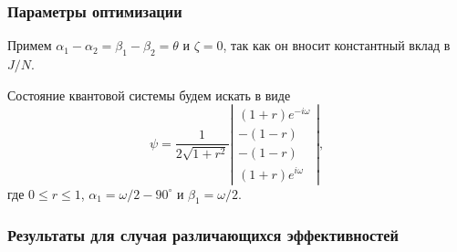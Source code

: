 \documentclass[11pt,pdf,hyperref={unicode}]{beamer}
\theoremstyle{definition}
\begin{document}
\begin{frame}
\frametitle{Параметры оптимизации}
Примем $\alpha_1 - \alpha_2 = \beta_1 - \beta_2 = \theta$ и $\zeta = 0$, так как он вносит константный вклад в $J/N$. 

Состояние квантовой системы будем искать в виде
\[
\psi = \frac{1}{2\sqrt{1 + r^2}}\left|
\begin{smallmatrix}
(1+r)e^{-i\omega}\\
-(1 - r)\\
-(1 - r)\\
(1 + r)e^{i\omega}
\end{smallmatrix}\right|,
\]
где $0 \leq r \leq 1$, $\alpha_1 = \omega / 2 - 90^\circ$ и $\beta_1 = \omega / 2$.
\end{frame}

\begin{frame}
\frametitle{Результаты для случая различающихся эффективностей}
\begin{figure}[h]
\end{figure}
\end{frame}
\end{document}
